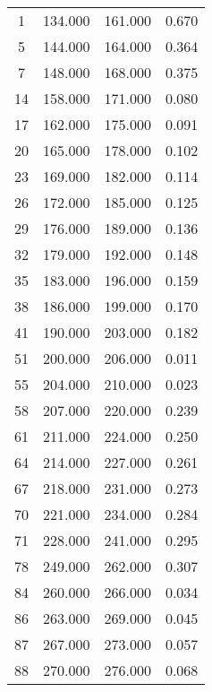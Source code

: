 % 
\begin{tabular}{cccc}
  \hline
  \hline
1 & 134.000 & 161.000 & 0.670 \\ 
  5 & 144.000 & 164.000 & 0.364 \\ 
  7 & 148.000 & 168.000 & 0.375 \\ 
  14 & 158.000 & 171.000 & 0.080 \\ 
  17 & 162.000 & 175.000 & 0.091 \\ 
  20 & 165.000 & 178.000 & 0.102 \\ 
  23 & 169.000 & 182.000 & 0.114 \\ 
  26 & 172.000 & 185.000 & 0.125 \\ 
  29 & 176.000 & 189.000 & 0.136 \\ 
  32 & 179.000 & 192.000 & 0.148 \\ 
  35 & 183.000 & 196.000 & 0.159 \\ 
  38 & 186.000 & 199.000 & 0.170 \\ 
  41 & 190.000 & 203.000 & 0.182 \\ 
  51 & 200.000 & 206.000 & 0.011 \\ 
  55 & 204.000 & 210.000 & 0.023 \\ 
  58 & 207.000 & 220.000 & 0.239 \\ 
  61 & 211.000 & 224.000 & 0.250 \\ 
  64 & 214.000 & 227.000 & 0.261 \\ 
  67 & 218.000 & 231.000 & 0.273 \\ 
  70 & 221.000 & 234.000 & 0.284 \\ 
  71 & 228.000 & 241.000 & 0.295 \\ 
  78 & 249.000 & 262.000 & 0.307 \\ 
  84 & 260.000 & 266.000 & 0.034 \\ 
  86 & 263.000 & 269.000 & 0.045 \\ 
  87 & 267.000 & 273.000 & 0.057 \\ 
  88 & 270.000 & 276.000 & 0.068 \\ 
   \hline
\end{tabular}
